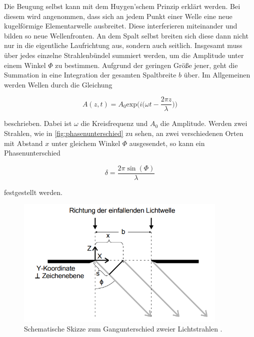 Die Beugung selbst kann mit dem Huygen'schem Prinzip erklärt werden.
Bei diesem wird angenommen, dass sich an jedem Punkt einer Welle eine neue kugelförmige Elementarwelle ausbreitet.
Diese interferieren miteinander und bilden so neue Wellenfronten.
An dem Spalt selbst breiten sich diese dann nicht nur in die eigentliche Laufrichtung aus, sondern auch seitlich.
Insgesamt muss über jedes einzelne Strahlenbündel summiert werden, um die Amplitude unter einem Winkel $\Phi$ zu bestimmen.
Aufgrund der geringen Größe jener, geht die Summation in eine Integration der gesamten Spaltbreite $b$ über.
Im Allgemeinen werden Wellen durch die Gleichung

\begin{equation}
    \label{eqn:wellengleichung}
    A(z,t) = A_0 \text{exp} \bigg( i \bigg( \omega t - \frac{2\pi z}{\lambda} \bigg) \bigg)
\end{equation}

beschrieben. Dabei ist $\omega$ die Kreisfrequenz und $A_0$ die Amplitude.
Werden zwei Strahlen, wie in \autoref{fig:phasenunterschied} zu sehen, an zwei verschiedenen Orten mit Abstand $x$ unter gleichem Winkel $\Phi$ ausgesendet, so kann ein Phasenunterschied

\begin{equation}
    \label{eqn:phasenunterschied}
    \delta = \frac{2 \pi \sin (\Phi)}{\lambda}
\end{equation}

festgestellt werden.

\begin{figure}
    \centering
    \includegraphics[width=0.9\textwidth]{content/phasenunterschied.png}
    \caption{Schematische Skizze zum Gangunterschied zweier Lichtstrahlen \cite{V406}.}
    \label{fig:phasenunterschied}
\end{figure}


